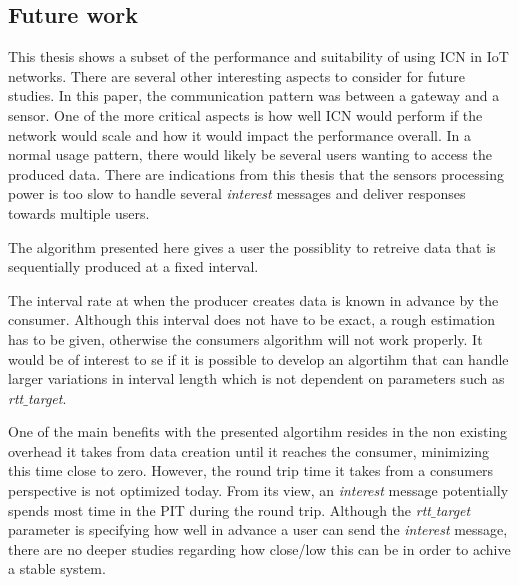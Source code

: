 \subsection{Future work}
This thesis shows a subset of the performance and suitability of using ICN in IoT networks. There are several other interesting aspects to consider for future studies. 
In this paper, the communication pattern was between a gateway and a sensor. One of the more critical aspects is how well ICN would perform if the network would scale and how it would impact the performance overall. 
In a normal usage pattern, there would likely be several users wanting to access the produced data. There are indications from this thesis that the sensors processing power is too slow to handle several \textit{interest} messages and deliver responses towards multiple users.

The algorithm presented here gives a user the possiblity to retreive data that is sequentially produced at a fixed interval.

The interval rate at when the producer creates data is known in advance by the consumer. Although this interval does not have to be exact, a rough estimation has to be given, otherwise the consumers algorithm will not work properly. %
It would be of interest to se if it is possible to develop an algortihm that can handle larger variations in interval length which is not dependent on parameters such as \textit{rtt$\_$target}.

One of the main benefits with the presented algortihm resides in the non existing overhead it takes from data creation until it reaches the consumer, minimizing this time close to zero. However, the round trip time it takes from a consumers perspective is not optimized today. From its view, an \textit{interest} message potentially spends most time in the PIT during the round trip.
Although the \textit{rtt$\_$target} parameter is specifying how well in advance a user can send the \textit{interest} message, there are no deeper studies regarding how close/low this can be in order to achive a stable system. 

